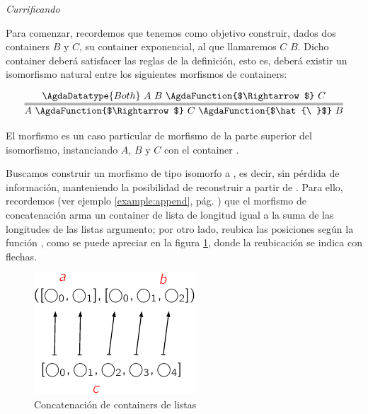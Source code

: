 \begin{example} {\it Currificando}  

  Para comenzar, recordemos que tenemos como objetivo construir, dados dos containers $B$ y $C$, su container exponencial, al que llamaremos $C$ \AgdaFunction{$\hat{\ }$} $B$. Dicho container deberá satisfacer las reglas de la definición, esto es, deberá existir un isomorfismo natural entre los siguientes morfismos de containers:

  $$
 \infer={A\ \AgdaFunction{$\Rightarrow$}\ C\ \AgdaFunction{$\hat{\ }$}\ B}{\AgdaDatatype{Both}\ A\ B\ \AgdaFunction{$\Rightarrow$}\ C} 
$$

 El morfismo  es un caso particular de morfismo de la parte superior del isomorfismo, instanciando $A$, $B$ y $C$ con el container .


   Buscamos construir un morfismo  de tipo  isomorfo a , es decir, sin pérdida de información, manteniendo la posibilidad de reconstruir  a partir de . Para ello, recordemos (ver ejemplo \ref{example:append}, pág. \pageref{example:append}) que el morfismo de concatenación arma un container de lista de longitud igual a la suma de las longitudes de las listas argumento; por otro lado, reubica las posiciones según la función , como se puede apreciar en la figura \ref{fig:append2}, donde la reubicación se indica con flechas.

\begin{figure}[H]
\begin{minipage}{0.3\textwidth}
\begin{center}
  \xymatrixrowsep{4pc} 
  \centerline{}
\end{center}
\end{minipage}
     \begin{minipage}{0.7\textwidth}
  \includegraphics{img/append1.pdf}
     \end{minipage}
     \caption{Concatenación de containers de listas}
     \label{fig:append2}
\end{figure}


\end{example}
